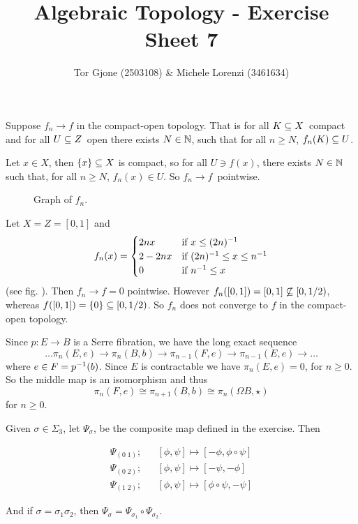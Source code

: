 \documentclass[a4paper,11pt,english]{article}
\title{\textbf{Algebraic Topology} - Exercise Sheet 7}
\author{Tor Gjone (2503108) \& Michele Lorenzi (3461634)}
\begin{document}
\mmaketitle

\begin{exercise}[1]
Suppose $f_n \to f$ in the compact-open topology. That is for all $K \subseteq
X$ compact and for all $U \subseteq Z$ open there exists $N \in \mathbb{N}$, such that for all
$n \ge N$, $f_n(K) \subseteq U$.

Let $x \in X$, then $\{x\} \subseteq X$ is compact, so for all $U \ni f(x)$, there
exists $N\in\mathbb{N}$ such that, for all $n\ge N$, $f_n(x) \in U$. So $f_n \to
f$ pointwise.

\begin{figure}[h]
\centering

\caption{Graph of $f_n$.}
\label{fig:1}
\end{figure}

Let $X = Z = [0,1]$ and 
\[ f_n(x) = \begin{cases} 
2nx &\text{if } x \le (2n)^{-1} \\
2 - 2nx &\text{if } (2n)^{-1} \le x \le n^{-1} \\
0 &\text{if } n^{-1} \le x
 \end{cases} \]
(see fig. ). Then $f_n \to f = 0$ pointwise. However $f_n([0,1]) =
[0,1] \not\subseteq [0,1/2)$, whereas $f([0,1]) = \{0\} \subseteq [0,1/2)$. So $f_n$ does
not converge to $f$ in the compact-open topology.
\end{exercise}



\begin{exercise}[2]
Since $p : E \to B$ is a Serre fibration, we have the long exact
sequence
\[ \dots \pi_n(E,e) \to \pi_n(B,b) \to \pi_{n-1}(F,e) \to \pi_{n-1}(E,e) \to
\dots \]
where $e \in F = p^{-1}(b)$. Since $E$ is contractable we have $\pi_n(E,e) = 0$,
for $n \ge 0$. So the middle map is an isomorphism and thus 
\[ \pi_{n}(F,e) \cong \pi_{n+1}(B,b) \cong \pi_n(\Omega B,\star) \]
for $n \ge 0$.
\end{exercise}


\begin{exercise}[3]

Given $\sigma \in \Sigma_3$, let $\Psi_\sigma$, be the composite map defined in
the exercise. Then

\begin{eqnarray*}
\Psi_{(0\; 1)};&& [\phi, \psi] \mapsto [-\phi, \phi\circ \psi] \\
\Psi_{(0\; 2)};&& [\phi, \psi] \mapsto [-\psi, -\phi] \\
\Psi_{(1\; 2)};&& [\phi, \psi] \mapsto [\phi\circ \psi, -\psi]
\end{eqnarray*}

And if $\sigma = \sigma_1 \sigma_2$, then $\Psi_\sigma = \Psi_{\sigma_1} \circ
\Psi_{\sigma_2}$.

\end{exercise}
\end{document}

